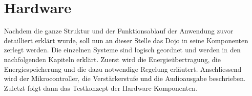 \section{Hardware}\label{sec:hardware}

Nachdem die ganze Struktur und der Funktionsablauf der Anwendung zuvor detailliert erklärt wurde, soll nun an dieser Stelle das Dojo in seine Komponenten zerlegt werden. Die einzelnen Systeme sind logisch geordnet und werden in den nachfolgenden Kapiteln erklärt. Zuerst wird die Energieübertragung, die Energiespeicherung und die dazu notwendige Regelung erläutert. Anschliessend wird der Mikrocontroller, die Verstärkerstufe und die Audioausgabe beschrieben. Zuletzt folgt dann das Testkonzept der Hardware-Komponenten.